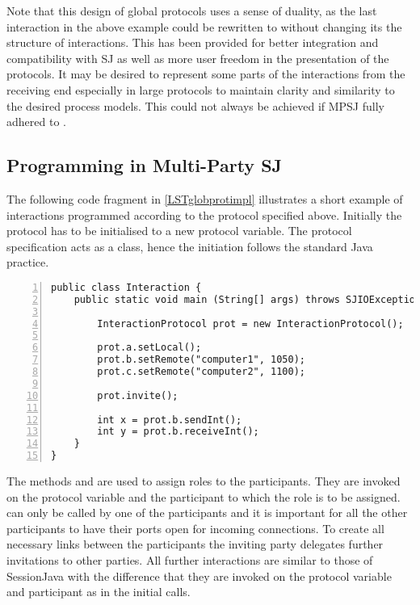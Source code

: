 Note that this design of global protocols uses a sense of duality, as the last interaction in the above example could be rewritten to  without changing its the structure of interactions. This has been provided for better integration and compatibility with SJ as well as more user freedom in the presentation of the protocols. It may be desired to represent some parts of the interactions from the receiving end especially in large protocols to maintain clarity and similarity to the desired process models. This could not always be achieved if MPSJ fully adhered to \cite{multiparty_sess_types}.

\subsection{Programming in Multi-Party SJ}

The following code fragment in \autoref{LSTglobprotimpl} illustrates a short example of interactions programmed according to the protocol specified above. Initially the protocol has to be initialised to a new protocol variable. The protocol specification acts as a class, hence the initiation follows the standard Java practice.

\begin{lstlisting}[basicstyle=\LISTINGSTYLE, numbers=left, caption={Interaction implementation of the protocol from \autoref{subsec:globprotdecl}}, label={LSTglobprotimpl}]
public class Interaction {
	public static void main (String[] args) throws SJIOException {		

		InteractionProtocol prot = new InteractionProtocol();
	
		prot.a.setLocal();
		prot.b.setRemote("computer1", 1050);
		prot.c.setRemote("computer2", 1100);

		prot.invite();		

		int x = prot.b.sendInt();
		int y = prot.b.receiveInt();
	}
}
\end{lstlisting}

The methods  and  are used to assign roles to the participants. They are invoked on the protocol variable and the participant to which the role is to be assigned.  can only be called by one of the participants and it is important for all the other participants to have their ports open for incoming connections. To create all necessary links between the participants the inviting party delegates further invitations to other parties. All further interactions are similar to those of SessionJava with the difference that they are invoked on the protocol variable and participant as in the initial  calls.

